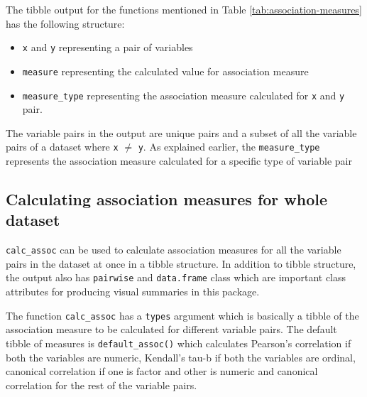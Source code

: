 The tibble output for the functions mentioned in Table
\ref{tab:association-measures} has the following structure:

\begin{itemize}
\tightlist
\item
  \texttt{x} and \texttt{y} representing a pair of variables
\item
  \texttt{measure} representing the calculated value for association
  measure
\item
  \texttt{measure\_type} representing the association measure calculated
  for \texttt{x} and \texttt{y} pair.
\end{itemize}

The variable pairs in the output are unique pairs and a subset of all
the variable pairs of a dataset where \texttt{x} \(\neq\) \texttt{y}. As
explained earlier, the \texttt{measure\_type} represents the association
measure calculated for a specific type of variable pair

\hypertarget{calculating-association-measures-for-whole-dataset}{%
\subsection{Calculating association measures for whole
dataset}\label{calculating-association-measures-for-whole-dataset}}

\texttt{calc\_assoc} can be used to calculate association measures for
all the variable pairs in the dataset at once in a tibble structure. In
addition to tibble structure, the output also has \texttt{pairwise} and
\texttt{data.frame} class which are important class attributes for
producing visual summaries in this package.

The function \texttt{calc\_assoc} has a \texttt{types} argument which is
basically a tibble of the association measure to be calculated for
different variable pairs. The default tibble of measures is
\texttt{default\_assoc()} which calculates Pearson's correlation if both
the variables are numeric, Kendall's tau-b if both the variables are
ordinal, canonical correlation if one is factor and other is numeric and
canonical correlation for the rest of the variable pairs.

